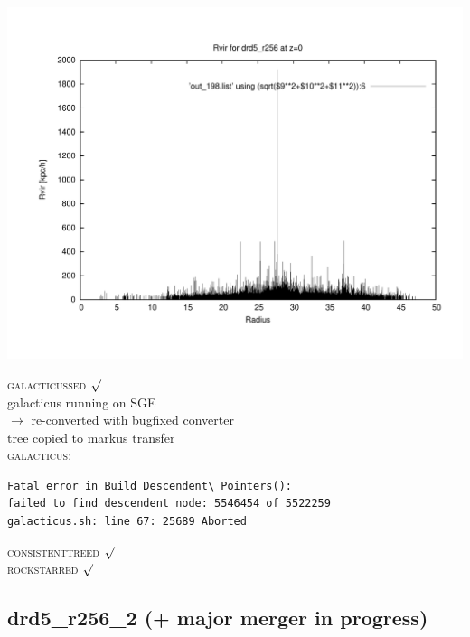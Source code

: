 \includegraphics[scale=0.3]{drd5_r256/plot_rvir_z0.pdf}

\textsc{galacticussed} $\surd$  \\
galacticus running on SGE \\
$\rightarrow$ re-converted with bugfixed converter \\
tree copied to markus transfer \\
\textsc{galacticus}: 
\begin{verbatim}
Fatal error in Build_Descendent\_Pointers():
failed to find descendent node: 5546454 of 5522259
galacticus.sh: line 67: 25689 Aborted  
\end{verbatim}
\textsc{consistenttreed} $\surd$  \\ 
\textsc{rockstarred} $\surd$ \\ 

% 
%
%
%
%
%
%
%

\newpage
\subsection{drd5\_r256\_2 (+ major merger in progress)} 

